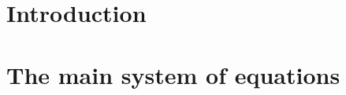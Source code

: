 \documentclass[usenatbib,onecolumn]{mnras}
\begin{document}
\title[]{}
\author[]{ }

\date{Accepted ---. Received ---; in
  original form --- }

\label{firstpage}
\pagerange{\pageref{firstpage}--\pageref{lastpage}} 
\maketitle

\begin{abstract}
\end{abstract}

\begin{keywords}
\end{keywords}

\section{Introduction}

\section{The main system of equations}
\end{document}
